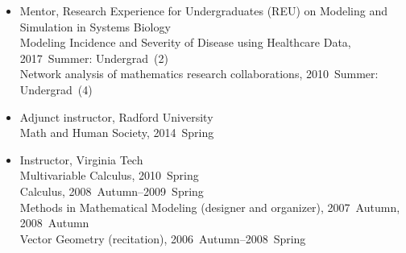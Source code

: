 \documentclass[10pt,a4paper]{article}
\begin{document}
\begin{itemize}[label=$\circ$,nolistsep]
\item
Mentor, Research Experience for Undergraduates (REU) on Modeling and Simulation in Systems Biology \\
Modeling Incidence and Severity of Disease using Healthcare Data, 2017~Summer: Undergrad~(2) \\
Network analysis of mathematics research collaborations, 2010~Summer: Undergrad~(4)
\item
Adjunct instructor, Radford University \\
Math and Human Society, 2014~Spring
\item
Instructor, Virginia Tech \\
Multivariable Calculus, 2010~Spring \\
Calculus, 2008~Autumn--2009~Spring \\
Methods in Mathematical Modeling (designer and organizer), 2007~Autumn, 2008~Autumn \\
Vector Geometry (recitation), 2006~Autumn--2008~Spring

\end{itemize}
\end{document}

